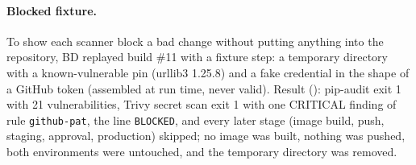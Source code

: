 \paragraph{Blocked fixture.} To show each scanner block a bad change without putting anything into the repository, BD replayed build \#11 with a fixture step: a temporary directory with a known-vulnerable pin (urllib3 1.25.8) and a fake credential in the shape of a GitHub token
(assembled at run time, never valid). Result (): pip-audit exit 1 with 21 vulnerabilities, Trivy secret scan exit 1 with one CRITICAL finding of rule \texttt{github-pat}, the line \texttt{BLOCKED}, and every later stage (image build, push, staging, approval, production)
skipped; no image was built, nothing was pushed, both environments were untouched, and the temporary directory was removed.

